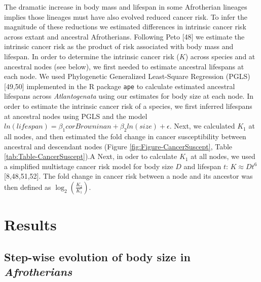 \documentclass[]{elsarticle} %
\begin{document}
The dramatic increase in body mass and lifespan in some Afrotherian lineages implies those lineages must have also evolved reduced cancer risk. To infer the magnitude of these reductions we estimated differences in intrinsic cancer risk across extant and ancestral Afrotherians. Following Peto {[}48{]} we estimate the intrinsic cancer risk as the product of risk associated with body mass and lifespan. In order to determine the intrinsic cancer risk (\(K\)) across species and at ancestral nodes (see below), we first needed to estimate ancestral lifespans at each node. We used Phylogenetic Generalized Least-Square Regression (PGLS) {[}49,50{]} implemented in the R package \texttt{ape} to calculate estimated ancestral lifespans across \emph{Atlantogenata} using our estimates for body size at each node. In order to estimate the intrinsic cancer risk of a species, we first inferred lifespans at ancestral nodes using PGLS and the model \(ln(lifespan) = \beta_{1}corBrowninan + \beta_{2}ln(size) + \epsilon\). Next, we calculated \(K_{1}\) at all nodes, and then estimated the fold change in cancer susceptibility between ancestral and descendant nodes (Figure \ref{fig:Figure-CancerSuscept}, Table \ref{tab:Table-CancerSuscept}).A Next, in oder to calculate \(K_{1}\) at all nodes, we used a simplified multistage cancer risk model for body size \(D\) and lifespan \(t\): \(K \approx Dt^6\) {[}8,48,51,52{]}. The fold change in cancer risk between a node and its ancestor was then defined as \(\log_{2}(\frac{K_{2}}{K_{1}})\).

\hypertarget{results}{%
\section{Results}\label{results}}

\hypertarget{step-wise-evolution-of-body-size-in-afrotherians}{%
\subsection{\texorpdfstring{Step-wise evolution of body size in \emph{Afrotherians}}{Step-wise evolution of body size in Afrotherians}}\label{step-wise-evolution-of-body-size-in-afrotherians}}
\end{document}
